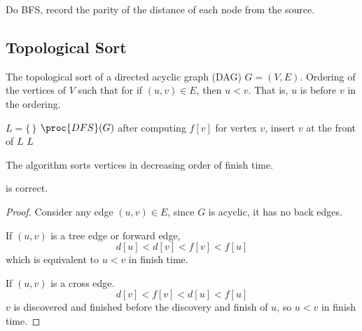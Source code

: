 Do BFS, record the parity of the distance of each node from the source.

\subsection{Topological Sort} 

The topological sort of a directed acyclic graph (DAG) $G = (V,E)$. Ordering of the vertices of $V$ such that for if $(u,v) \in E$, then $u < v$. That is, $u$ is before $v$ in the ordering.

\begin{codebox}
    \li $L = \{ \, \}$ 
    \li $\proc{DFS}(G)$ 
    \li \> after computing $f[v]$ for vertex $v$, insert $v$ at the front of $L$
    \li \Return $L$  
\end{codebox}

The algorithm sorts vertices in decreasing order of finish time.

\begin{theorem}
     is correct.
\end{theorem}

\begin{proof}
    Consider any edge $(u,v) \in E$, since $G$ is acyclic, it has no back edges.

    If $(u,v)$ is a tree edge or forward edge,
    $$
    d[u] < d[v] < f[v] < f[u]
    $$
    which is equivalent to $u < v$ in finish time.

    If $(u,v)$ is a cross edge.
    $$
    d[v] < f[v] < d[u] < f[u]
    $$
    $v$ is discovered and finished before the discovery and finish of $u$, so $u < v$ in finish time.
\end{proof}